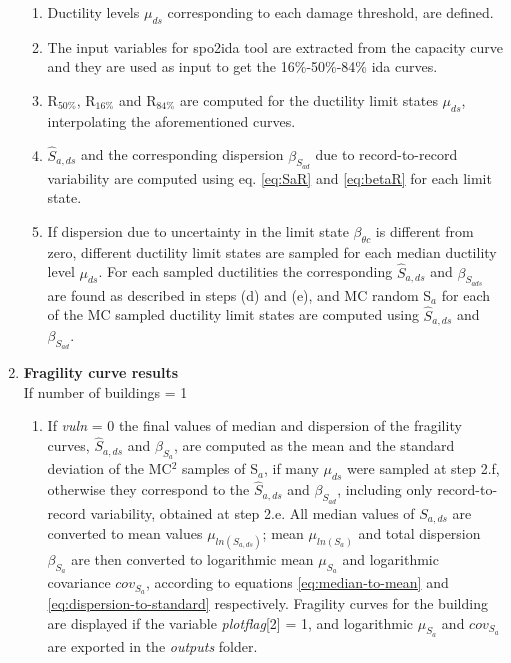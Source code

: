 \begin{enumerate}
\begin{enumerate}
\item Ductility levels $\mu_{ds}$ corresponding to each damage threshold, are defined.

\item The input variables for spo2ida tool are extracted from the capacity curve and they are used as input to get the 16\%-50\%-84\% ida curves.

\item R$_{50\%}$, R$_{16\%}$ and R$_{84\%}$ are computed for the ductility limit states $\mu_{ds}$, interpolating the aforementioned curves.

\item $\hat{S}_{a,ds}$ and the corresponding dispersion $\beta_{S_{a d}}$ due to record-to-record variability are computed using eq. \ref{eq:SaR} and \ref{eq:betaR} for each limit state.

\item If dispersion due to uncertainty in the limit state $\beta_{\theta c}$ is different from zero, different ductility limit states are sampled for each median ductility level $\mu_{ds}$. For each sampled ductilities the corresponding $\hat{S}_{a,ds}$ and $\beta_{S_{a ds}}$ are found as described in steps (d) and (e), and MC random S$_a$ for each of the MC sampled ductility limit states are computed using $\hat{S}_{a,ds}$ and $\beta_{S_{a d}}$.\\

\end{enumerate}

\item \textbf{Fragility curve results}\\
If number of buildings = 1\\
\begin{enumerate}
\item If \textit{vuln} = 0
the final values of median and dispersion of the fragility curves, $\hat{S}_{a,ds}$ and $\beta_{S_a}$, are computed as the mean and the standard deviation of the MC$^2$ samples of S$_a$, if many $\mu_{ds}$ were sampled at step 2.f, otherwise they correspond to the $\hat{S}_{a,ds}$ and $\beta_{S_{a d}}$, including only record-to-record variability, obtained at step 2.e.
All median values of $S_{a, ds}$ are converted to mean values $\mu_{ln(S_{a, ds})}$; mean $\mu_{ln(S_{a})}$ and total dispersion $\beta_{S_a}$ are then converted to logarithmic mean $\mu_{S_a}$ and logarithmic covariance $cov_{S_a}$, according to equations \ref{eq:median-to-mean} and \ref{eq:dispersion-to-standard} respectively.
Fragility curves for the building are displayed if the variable \textit{plotflag}[2] = 1, and logarithmic $\mu_{S_a}$ and $cov_{S_a}$ are exported in the \textit{outputs} folder.


\end{enumerate}
\end{enumerate}

